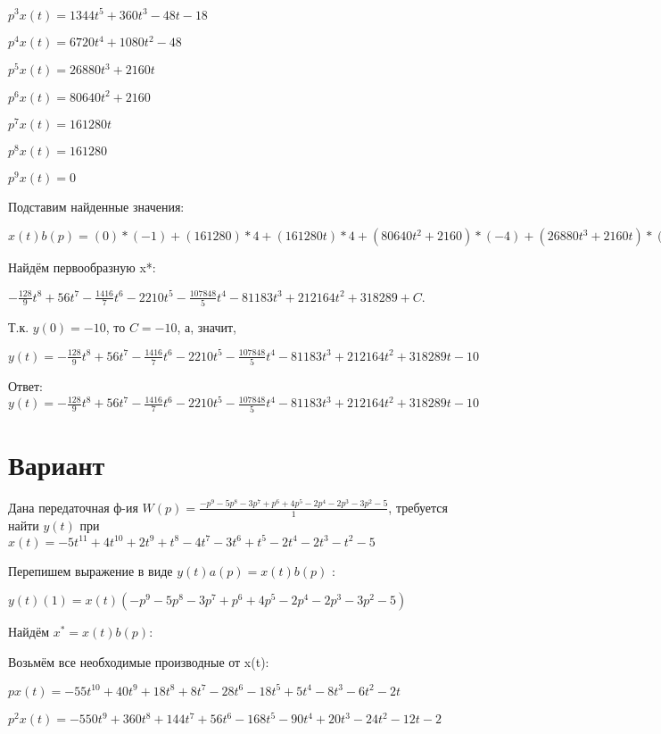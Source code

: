 \documentclass{article}
\begin{document}
{{{{{$p^3x(t)=1344t^{5}+360t^{3}-48t-18$

$p^4x(t)=6720t^{4}+1080t^{2}-48$

$p^5x(t)=26880t^{3}+2160t$

$p^6x(t)=80640t^{2}+2160$

$p^7x(t)=161280t$

$p^8x(t)=161280$

$p^9x(t)=0$

Подставим найденные значения:

$x(t)b(p) = (0)*(-1)+(161280)*4+(161280t)*4+(80640t^{2}+2160)*(-4)+(26880t^{3}+2160t)*(-4)+(6720t^{4}+1080t^{2}-48)*(-2)+(1344t^{5}+360t^{3}-48t-18)*(-1)+(224t^{6}+90t^{4}-24t^{2}-18t)*2+(32t^{7}+18t^{5}-8t^{3}-9t^{2}+4)*(-4)=-128t^{7}+448t^{6}-1416t^{5}-13260t^{4}-107848t^{3}-324732t^{2}+636492t$





Найдём первообразную x*:

$-\frac{128}{9}t^{8}+56t^{7}-\frac{1416}{7}t^{6}-2210t^{5}-\frac{107848}{5}t^{4}-81183t^{3}+212164t^{2}+318289+C.$

Т.к. $y(0)=-10$, то $C=-10$, а, значит, 

$y(t)=-\frac{128}{9}t^{8}+56t^{7}-\frac{1416}{7}t^{6}-2210t^{5}-\frac{107848}{5}t^{4}-81183t^{3}+212164t^{2}+318289t-10$

Ответ: $y(t) = -\frac{128}{9}t^{8}+56t^{7}-\frac{1416}{7}t^{6}-2210t^{5}-\frac{107848}{5}t^{4}-81183t^{3}+212164t^{2}+318289t-10$

\section{Вариант}

Дана передаточная ф-ия $W(p)=\frac{-p^{9}-5p^{8}-3p^{7}+p^{6}+4p^{5}-2p^{4}-2p^{3}-3p^{2}-5}{1}$, требуется найти $y(t)$ при $x(t)=-5t^{11}+4t^{10}+2t^{9}+t^{8}-4t^{7}-3t^{6}+t^{5}-2t^{4}-2t^{3}-t^{2}-5$

Перепишем выражение в виде $y(t)a(p)=x(t)b(p)$ :

$y(t)(1)=x(t)(-p^{9}-5p^{8}-3p^{7}+p^{6}+4p^{5}-2p^{4}-2p^{3}-3p^{2}-5)$

Найдём $x^*=x(t)b(p)$:

Возьмём все необходимые производные от x(t):

$px(t)=-55t^{10}+40t^{9}+18t^{8}+8t^{7}-28t^{6}-18t^{5}+5t^{4}-8t^{3}-6t^{2}-2t$

$p^2x(t)=-550t^{9}+360t^{8}+144t^{7}+56t^{6}-168t^{5}-90t^{4}+20t^{3}-24t^{2}-12t-2$

}}}}}
\end{document}
